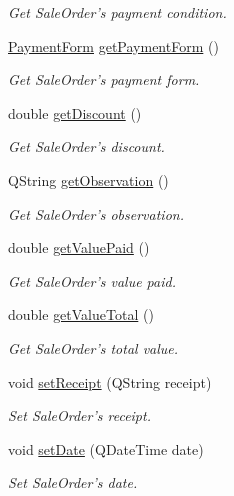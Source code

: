 \begin{DoxyCompactItemize}
\begin{DoxyCompactList}\small\item\em \-Get \-Sale\-Order's payment condition. \end{DoxyCompactList}\item 
\hyperlink{class_sales_order_aea62d62de9cfe64f734061c664156744}{\-Payment\-Form} \hyperlink{class_sales_order_a81e054e101c7ee87258c63e1924c8c19}{get\-Payment\-Form} ()
\begin{DoxyCompactList}\small\item\em \-Get \-Sale\-Order's payment form. \end{DoxyCompactList}\item 
double \hyperlink{class_sales_order_a5fed8bdb94cadce7682ef96aef9d3602}{get\-Discount} ()
\begin{DoxyCompactList}\small\item\em \-Get \-Sale\-Order's discount. \end{DoxyCompactList}\item 
\-Q\-String \hyperlink{class_sales_order_acd20cb36bde9b7de8755f332b21cc8f4}{get\-Observation} ()
\begin{DoxyCompactList}\small\item\em \-Get \-Sale\-Order's observation. \end{DoxyCompactList}\item 
double \hyperlink{class_sales_order_a22d54843a30f319be357bf52156bb73e}{get\-Value\-Paid} ()
\begin{DoxyCompactList}\small\item\em \-Get \-Sale\-Order's value paid. \end{DoxyCompactList}\item 
double \hyperlink{class_sales_order_ac3ccc93985ddbd4c2bab0fbac84aee18}{get\-Value\-Total} ()
\begin{DoxyCompactList}\small\item\em \-Get \-Sale\-Order's total value. \end{DoxyCompactList}\item 
void \hyperlink{class_sales_order_ad58819b9747890112345ecded8cd2821}{set\-Receipt} (\-Q\-String receipt)
\begin{DoxyCompactList}\small\item\em \-Set \-Sale\-Order's receipt. \end{DoxyCompactList}\item 
void \hyperlink{class_sales_order_ad977a7351cd1f2300db315c641dcc746}{set\-Date} (\-Q\-Date\-Time date)
\begin{DoxyCompactList}\small\item\em \-Set \-Sale\-Order's date. \end{DoxyCompactList}\item 

\end{DoxyCompactItemize}
